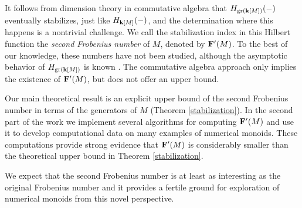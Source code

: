 \begin{introduction}
It follows from dimension theory in commutative algebra that $H_{\operatorname{gr}(\mathbf{k}[M])}(-)$ eventually stabilizes, just like $H_{\mathbf{k}[M]}(-)$, and the determination where this happens is a nontrivial challenge. We call the stabilization index in this Hilbert function the \emph{second Frobenius number} of $M$, denoted by $\mathbf{F}'(M)$. To the best of our knowledge, these numbers have not been studied, although the asymptotic behavior of $H_{\operatorname{gr}(\mathbf{k}[M])}$ is known \cite{maximal_length}. The commutative algebra approach only implies the existence of $\mathbf{F}'(M)$, but does not offer an upper bound. 

Our main theoretical result is an explicit upper bound of the second Frobenius number in terms of the generators of $M$ (Theorem \ref{stabilization}). In the second part of the work we implement several algorithms for computing $\mathbf{F}'(M)$ and use it to develop computational data on many examples of numerical monoids. These computations provide strong evidence that $\mathbf{F}'(M)$ is considerably smaller than the theoretical upper bound in Theorem \ref{stabilization}.

We expect that the second Frobenius number is at least as interesting as the original Frobenius number and it provides a fertile ground for exploration of numerical monoids from this novel perspective.


\end{introduction}
